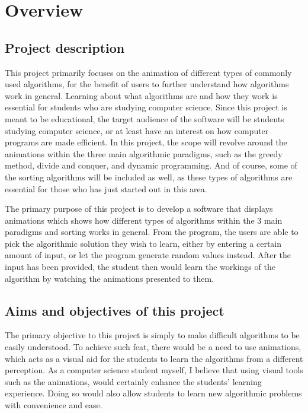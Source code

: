 \chapter{Overview}

\section{Project description}
This project primarily focuses on the animation of different types of commonly used algorithms, for the benefit of users to further understand how algorithms work in general. Learning about what algorithms are and how they work is essential for students who are studying computer science. Since this project is meant to be educational, the target audience of the software will be students studying computer science, or at least have an interest on how computer programs are made efficient. In this project, the scope will revolve around the animations within the three main algorithmic paradigms, such as the greedy method, divide and conquer, and dynamic programming. And of course, some of the sorting algorithms will be included as well, as these types of algorithms are essential for those who has just started out in this area.

The primary purpose of this project is to develop a software that displays animations which shows how different types of algorithms within the 3 main paradigms and sorting works in general. From the program, the users are able to pick the algorithmic solution they wish to learn, either by entering a certain amount of input, or let the program generate random values instead. After the input has been provided, the student then would learn the workings of the algorithm by watching the animations presented to them.

\section{Aims and objectives of this project}
The primary objective to this project is simply to make difficult algorithms to be easily understood. To achieve such feat, there would be a need to use animations, which acts as a visual aid for the students to learn the algorithms from a different perception. As a computer science student myself, I believe that using visual tools such as the animations, would certainly enhance the students' learning experience. Doing so would also allow students to learn new algorithmic problems with convenience and ease.

